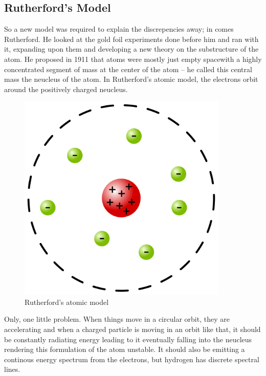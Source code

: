 \subsection{Rutherford's Model}

So a new model was required to explain the discrepencies away; in comes Rutherford.
He looked at the gold foil experiments done before him and ran with it, expanding upon them and developing a new theory on the substructure of the atom.
He proposed in 1911 that atoms were mostly just empty spacewith a highly concentrated segment of mass at the center of the atom -- he called this central mass the neucleus of the atom.
In Rutherford's atomic model, the electrons orbit around the positively charged neucleus.

\begin{figure}[H]
  \centering
  \includegraphics[width=100mm]{figures/rutherford.png}
  \caption{Rutherford's atomic model}
  \label{rutherford}
\end{figure}

Only, one little problem.
When things move in a circular orbit, they are accelerating and when a charged particle is moving in an orbit like that,  it should be constantly radiating energy leading to it eventually falling into the neucleus rendering this formulation of the atom unstable.
It should also be emitting a continous energy spectrum from the electrons, but hydrogen has discrete spectral lines.

